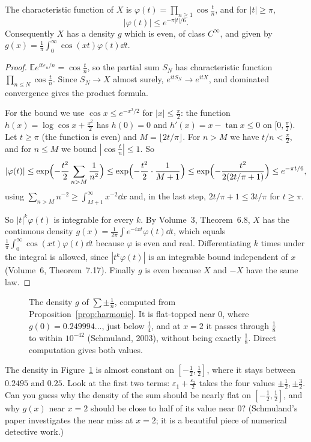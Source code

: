 \begin{proposition}\label{prop:harmonic}
The characteristic function of $X$ is $\varphi(t)=\prod_{n\ge1}\cos\frac tn$, and for $|t|\ge\pi$,
\[
|\varphi(t)|\le e^{-\pi|t|/6}.
\]
Consequently $X$ has a density $g$ which is even, of class $C^\infty$, and given by $g(x)=\frac1\pi\int_0^\infty\cos(xt)\varphi(t)\dd t$.
\end{proposition}
\begin{proof}
$\mathbb E e^{it\varepsilon_n/n}=\cos\frac tn$, so the partial sum $S_N$ has characteristic function $\prod_{n\le N}\cos\frac tn$.
Since $S_N\to X$ almost surely, $e^{itS_N}\to e^{itX}$, and dominated convergence gives the product formula.

For the bound we use $\cos x\le e^{-x^2/2}$ for $|x|\le\frac\pi2$: the function $h(x)=\log\cos x+\frac{x^2}2$ has $h(0)=0$ and
$h'(x)=x-\tan x\le0$ on $[0,\frac\pi2)$. Let $t\ge\pi$ (the function is even) and $M=\lfloor2t/\pi\rfloor$. For $n>M$ we have
$t/n<\frac\pi2$, and for $n\le M$ we bound $|\cos\frac tn|\le1$. So
\[
|\varphi(t)|\le\exp\Bigl(-\frac{t^2}2\sum_{n>M}\frac1{n^2}\Bigr)\le\exp\Bigl(-\frac{t^2}2\cdot\frac1{M+1}\Bigr)\le
\exp\Bigl(-\frac{t^2}{2(2t/\pi+1)}\Bigr)\le e^{-\pi t/6},
\]
using $\sum_{n>M}n^{-2}\ge\int_{M+1}^\infty x^{-2}\dd x$ and, in the last step, $2t/\pi+1\le3t/\pi$ for $t\ge\pi$.

So $|t|^k\varphi(t)$ is integrable for every $k$. By Volume~3, Theorem~6.8, $X$ has the continuous density
$g(x)=\frac1{2\pi}\int e^{-ixt}\varphi(t)\dd t$, which equals $\frac1\pi\int_0^\infty\cos(xt)\varphi(t)\dd t$ because $\varphi$ is even
and real. Differentiating $k$ times under the integral is allowed, since $|t^k\varphi(t)|$ is an integrable bound independent of $x$
(Volume~6, Theorem~7.17). Finally $g$ is even because $X$ and $-X$ have the same law.
\end{proof}

\begin{figure}[ht]
\centering{}
\caption{The density $g$ of $\sum\pm\frac1n$, computed from Proposition~\ref{prop:harmonic}. It is flat-topped near $0$, where
$g(0)=0.249994\ldots$, just below $\frac14$, and at $x=2$ it passes through $\frac18$ to within $10^{-42}$ (Schmuland, 2003),
without being exactly $\frac18$. Direct computation gives both values.}
\label{fig:harmonic}
\end{figure}

\begin{think}
The density in Figure~\ref{fig:harmonic} is almost constant on $[-\frac12,\frac12]$, where it stays between $0.2495$ and $0.25$. Look at the first two terms:
$\varepsilon_1+\frac{\varepsilon_2}2$ takes the four values $\pm\frac12,\pm\frac32$. Can you guess why the density of the sum
should be nearly flat on $[-\frac12,\frac12]$, and why $g(x)$ near $x=2$ should be close to half of its value near $0$? (Schmuland's
paper investigates the near miss at $x=2$; it is a beautiful piece of numerical detective work.)
\end{think}


